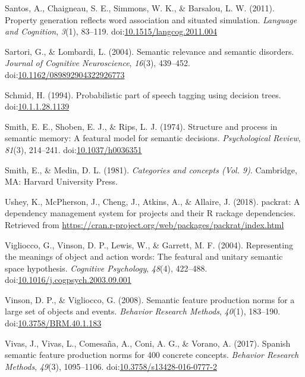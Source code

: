 \documentclass[man]{apa6}
\begin{document}
\leavevmode\hypertarget{ref-Santos2011}{}%
Santos, A., Chaigneau, S. E., Simmons, W. K., \& Barsalou, L. W. (2011). Property generation reflects word association and situated simulation. \emph{Language and Cognition}, \emph{3}(1), 83--119. doi:\href{https://doi.org/10.1515/langcog.2011.004}{10.1515/langcog.2011.004}

\leavevmode\hypertarget{ref-Sartori2004}{}%
Sartori, G., \& Lombardi, L. (2004). Semantic relevance and semantic disorders. \emph{Journal of Cognitive Neuroscience}, \emph{16}(3), 439--452. doi:\href{https://doi.org/10.1162/089892904322926773}{10.1162/089892904322926773}

\leavevmode\hypertarget{ref-Schmid1994}{}%
Schmid, H. (1994). Probabilistic part of speech tagging using decision trees. doi:\href{https://doi.org/10.1.1.28.1139}{10.1.1.28.1139}

\leavevmode\hypertarget{ref-Smith1974}{}%
Smith, E. E., Shoben, E. J., \& Rips, L. J. (1974). Structure and process in semantic memory: A featural model for semantic decisions. \emph{Psychological Review}, \emph{81}(3), 214--241. doi:\href{https://doi.org/10.1037/h0036351}{10.1037/h0036351}

\leavevmode\hypertarget{ref-Smith1981}{}%
Smith, E., \& Medin, D. L. (1981). \emph{Categories and concepts (Vol. 9)}. Cambridge, MA: Harvard University Press.

\leavevmode\hypertarget{ref-Ushey2018}{}%
Ushey, K., McPherson, J., Cheng, J., Atkins, A., \& Allaire, J. (2018). packrat: A dependency management system for projects and their R rackage dependencies. Retrieved from \url{https://cran.r-project.org/web/packages/packrat/index.html}

\leavevmode\hypertarget{ref-Vigliocco2004}{}%
Vigliocco, G., Vinson, D. P., Lewis, W., \& Garrett, M. F. (2004). Representing the meanings of object and action words: The featural and unitary semantic space hypothesis. \emph{Cognitive Psychology}, \emph{48}(4), 422--488. doi:\href{https://doi.org/10.1016/j.cogpsych.2003.09.001}{10.1016/j.cogpsych.2003.09.001}

\leavevmode\hypertarget{ref-Vinson2008}{}%
Vinson, D. P., \& Vigliocco, G. (2008). Semantic feature production norms for a large set of objects and events. \emph{Behavior Research Methods}, \emph{40}(1), 183--190. doi:\href{https://doi.org/10.3758/BRM.40.1.183}{10.3758/BRM.40.1.183}

\leavevmode\hypertarget{ref-Vivas2017}{}%
Vivas, J., Vivas, L., Comesaña, A., Coni, A. G., \& Vorano, A. (2017). Spanish semantic feature production norms for 400 concrete concepts. \emph{Behavior Research Methods}, \emph{49}(3), 1095--1106. doi:\href{https://doi.org/10.3758/s13428-016-0777-2}{10.3758/s13428-016-0777-2}
\end{document}

